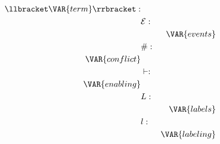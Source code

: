\begin{align*}
    \llbracket  \VAR{term}\rrbracket: & & \\
    & \mathcal{E}: & \\
    & & \VAR{events} \\
    & \#: & \\
    \VAR{conflict} \\
    & \vdash: & \\
    \VAR{enabling} \\
    & L: & \\
    & & \VAR{labels} \\
    & l: & \\
    & & \VAR{labeling} \\
\end{align*}